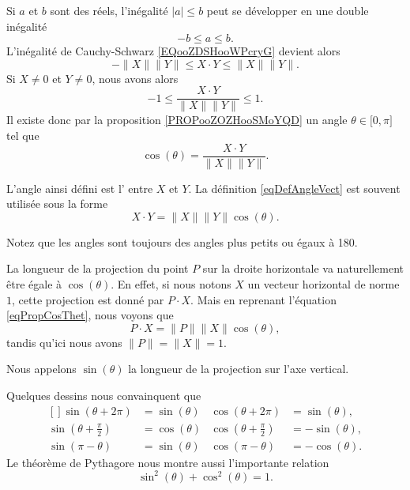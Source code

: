 Si $a$ et $b$ sont des réels, l'inégalité $| a |\leq b$ peut se développer en une double inégalité
\begin{equation}
	-b\leq a\leq b.
\end{equation}
L'inégalité de Cauchy-Schwarz \eqref{EQooZDSHooWPcryG} devient alors
\begin{equation}
	-\| X \|\| Y \|\leq X\cdot Y\leq\| X \|\| Y \|.
\end{equation}
Si $X\neq 0$ et $Y\neq 0$, nous avons alors
\begin{equation}
	-1\leq\frac{ X\cdot Y }{ \| X \|\| Y \| }\leq 1.
\end{equation}
Il existe donc par la proposition \ref{PROPooZOZHooSMoYQD} un angle $\theta\in\mathopen[ 0 , \pi \mathclose]$ tel que
\begin{equation}		\label{eqDefAngleVect}
	\cos(\theta)=\frac{ X\cdot Y }{ \| X \|\| Y \| }.
\end{equation}

\begin{definition}      \label{DEFooSVDZooPWHwFQ}
L'angle ainsi défini est l' entre $X$ et $Y$. La définition \eqref{eqDefAngleVect} est souvent utilisée sous la forme
\begin{equation}		\label{eqPropCosThet}
	X\cdot Y=\| X \|\| Y \|\cos(\theta).
\end{equation}
\end{definition}

Notez que les angles sont toujours des angles plus petits ou égaux à \unit{180}{\degree}.

La longueur de la projection du point $P$ sur la droite horizontale va naturellement être égale à $\cos(\theta)$. En effet, si nous notons $X$ un vecteur horizontal de norme $1$, cette projection est donné par $P\cdot X$. Mais en reprenant l'équation \eqref{eqPropCosThet}, nous voyons que
\begin{equation}
	P\cdot X=\| P \|\| X \|\cos(\theta),
\end{equation}
tandis qu'ici nous avons $\| P \|=\| X \|=1$.

Nous appelons $\sin(\theta)$ la longueur de la projection sur l'axe vertical.

Quelques dessins nous convainquent que 
\begin{equation}
	\begin{aligned}[]
		\sin(\theta+2\pi)&=\sin(\theta)&\cos(\theta+2\pi)&=\sin(\theta),\\
		\sin(\theta+\frac{ \pi }{2})&=\cos(\theta)&\cos(\theta+\frac{ \pi }{2})&=-\sin(\theta),\\
		\sin(\pi-\theta)&=\sin(\theta)&\cos(\pi-\theta)&=-\cos(\theta).
	\end{aligned}
\end{equation}
Le théorème de Pythagore nous montre aussi l'importante relation
\begin{equation}
	\sin^2(\theta)+\cos^2(\theta)=1.
\end{equation}

